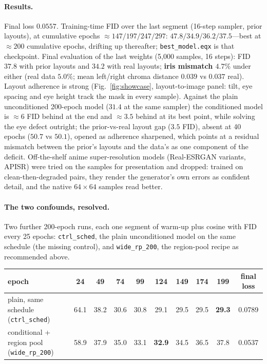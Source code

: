 \documentclass[11pt]{article}
\begin{document}
\paragraph{Results.} Final loss $0.0557$. Training-time FID over the last
segment (16-step sampler, prior layouts), at cumulative epochs $\approx147/197/247/297$:
$47.8/34.9/36.2/37.5$---best at $\approx200$ cumulative epochs, drifting up
thereafter; \texttt{best\_model.eqx} is that checkpoint. Final evaluation of the last
weights (5{,}000 samples, 16 steps): FID $\mathbf{37.8}$ with prior layouts and
$34.2$ with real layouts; \textbf{iris mismatch $4.7\%$} under either (real data
$5.0\%$; mean left/right chroma distance $0.039$ vs $0.037$ real). Layout adherence
is strong (Fig.~\ref{fig:showcase}, layout-to-image panel: tilt, eye spacing and eye
height track the mask in every sample). Against the plain unconditioned 200-epoch model
($31.4$ at the same sampler) the conditioned model is $\approx6$ FID behind at the
end and $\approx3.5$ behind at its best point, while solving the eye defect outright;
the prior-vs-real layout gap ($3.5$ FID), absent at 40 epochs ($50.7$ vs $50.1$),
opened as adherence sharpened, which points at a residual mismatch between the prior's
layouts and the data's as one component of the deficit. Off-the-shelf
anime super-resolution models (Real-ESRGAN variants, APISR) were tried on the samples
for presentation and dropped: trained on clean-then-degraded pairs, they render the
generator's own errors as confident detail, and the native $64\times64$ samples read
better.

\paragraph{The two confounds, resolved.} Two further 200-epoch runs, each one segment
of warm-up plus cosine with FID every 25 epochs: \texttt{ctrl\_sched}, the plain
unconditioned model on the same schedule (the missing control), and
\texttt{wide\_rp\_200}, the region-pool recipe as recommended above.

\begin{center}\small
\begin{tabular}{lcccccccc|c}
\toprule
epoch & 24 & 49 & 74 & 99 & 124 & 149 & 174 & 199 & final loss \\
\midrule
plain, same schedule (\texttt{ctrl\_sched}) & 64.1 & 38.2 & 30.6 & 30.8 & 29.1 & 29.5 & 29.5 & \textbf{29.3} & 0.0789 \\
conditional + region pool (\texttt{wide\_rp\_200}) & 58.9 & 37.9 & 35.0 & 33.1 & \textbf{32.9} & 34.5 & 36.5 & 37.8 & 0.0537 \\
\bottomrule
\end{tabular}
\end{center}
\end{document}
